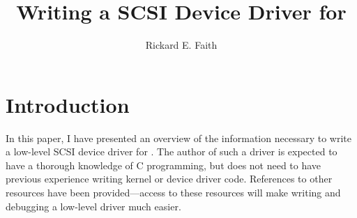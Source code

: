 \if@twoside
\oddsidemargin 0.5in
\evensidemargin 0in
\def\ps@headings{\let\@mkboth\markboth
  \def\@oddfoot{}\def\@evenfoot{}%
  \def\@evenhead{\protect\rule[-4pt]{\textwidth}{.5pt}\kern-\textwidth
    \rm \thepage\hfil \sl \leftmark}     %
  \def\@oddhead{\protect\rule[-4pt]{\textwidth}{.5pt}\kern-\textwidth
    {\sl \rightmark}\hfil \rm\thepage}    %
  \def\chaptermark##1{\markboth {\uppercase{\ifnum \c@secnumdepth >\m@ne
        \@chapapp\ \thechapter. \ \fi ##1}}{}}%
  \def\sectionmark##1{\markright {\uppercase{\ifnum \c@secnumdepth >\z@
        \thesection. \ \fi ##1}}}}
\else
\oddsidemargin 0.5in
\evensidemargin\oddsidemargin
\def\ps@headings{\let\@mkboth\markboth
  \def\@oddfoot{}\def\@evenfoot{}%
  \def\@oddhead{\protect\rule[-4pt]{\textwidth}{.5pt}\kern-\textwidth
    {\sl \rightmark}\hfil \rm\thepage}    %
  \def\@evenhead\@oddhead
  \def\chaptermark##1{\markboth {\uppercase{\ifnum \c@secnumdepth >\m@ne
        \@chapapp\ \thechapter. \ \fi ##1}}{}}%
  \def\sectionmark##1{\markright {\uppercase{\ifnum \c@secnumdepth >\z@
        \thesection. \ \fi ##1}}}}
\fi
\ps@headings
\makeatother

\title{Writing a SCSI Device Driver for \Linux{}}

\author{Rickard E. Faith}


\begin{singlespace}
  \maketitle\thispagestyle{empty}
  \tableofcontents
\end{singlespace}

\pagebreak{}


\section{Introduction}

In this paper, I have presented an overview of the information necessary to
write a low-level SCSI device driver for \Linux{}.  The author of such a
driver is expected to have a thorough knowledge of C programming, but does
not need to have previous experience writing kernel or device driver code.
References to other resources have been provided---access to these
resources will make writing and debugging a low-level driver much easier.

